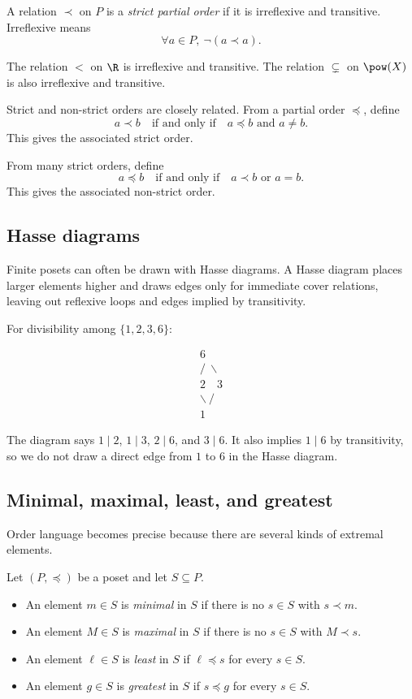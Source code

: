 \begin{definition}
A relation $\prec$ on $P$ is a \emph{strict partial order} if it is irreflexive and transitive. Irreflexive means
\[
\forall a\in P,\ \neg(a\prec a).
\]
\end{definition}

The relation $<$ on $\R$ is irreflexive and transitive. The relation $\subsetneq$ on $\pow(X)$ is also irreflexive and transitive.

Strict and non-strict orders are closely related. From a partial order $\preceq$, define
\[
a\prec b\quad\text{if and only if}\quad a\preceq b\text{ and }a\neq b.
\]
This gives the associated strict order.

From many strict orders, define
\[
a\preceq b\quad\text{if and only if}\quad a\prec b\text{ or }a=b.
\]
This gives the associated non-strict order.

\subsection{Hasse diagrams}

Finite posets can often be drawn with Hasse diagrams. A Hasse diagram places larger elements higher and draws edges only for immediate cover relations, leaving out reflexive loops and edges implied by transitivity.

For divisibility among $\{1,2,3,6\}$:

\[
\begin{array}{c}
6\\
/ \ \backslash\\
2\quad 3\\
\backslash\ /\\
1
\end{array}
\]

The diagram says $1\mid2$, $1\mid3$, $2\mid6$, and $3\mid6$. It also implies $1\mid6$ by transitivity, so we do not draw a direct edge from $1$ to $6$ in the Hasse diagram.

\subsection{Minimal, maximal, least, and greatest}

Order language becomes precise because there are several kinds of extremal elements.

\begin{definition}
Let $(P,\preceq)$ be a poset and let $S\subseteq P$.
\begin{itemize}
\item An element $m\in S$ is \emph{minimal} in $S$ if there is no $s\in S$ with $s\prec m$.
\item An element $M\in S$ is \emph{maximal} in $S$ if there is no $s\in S$ with $M\prec s$.
\item An element $\ell\in S$ is \emph{least} in $S$ if $\ell\preceq s$ for every $s\in S$.
\item An element $g\in S$ is \emph{greatest} in $S$ if $s\preceq g$ for every $s\in S$.
\end{itemize}
\end{definition}

